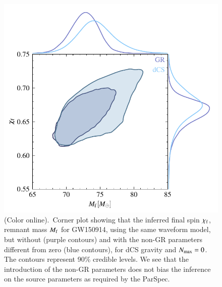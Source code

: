 \documentclass[twocolumn,
               prd,
               aps,
               superscriptaddress,
               tightenlines,
               nofootinbib,
               eqsecnum,
               amsfonts,
               amsmath,
               longbibliography]{revtex4-1}
\begin{document}
\begin{figure}[t]
\includegraphics[width=0.9\columnwidth]{figs/tmp_GW150914_intrinsic_params_remnant.pdf}
\caption{(Color online).~Corner plot showing that the inferred final spin $\chi_{\rm f}$,
remnant mass $M_{\rm f}$ for GW150914, using the same waveform model,
but without (purple contours) and with the non-GR parameters
different from zero (blue contours), for
dCS gravity and $N_{\rm max}=0$.
%
The contours represent 90\% credible levels.
%
We see that the introduction of the non-GR parameters does not bias the
inference on the source parameters as required by the ParSpec.
}
\label{fig:corner_plot}
\end{figure}
\end{document}

